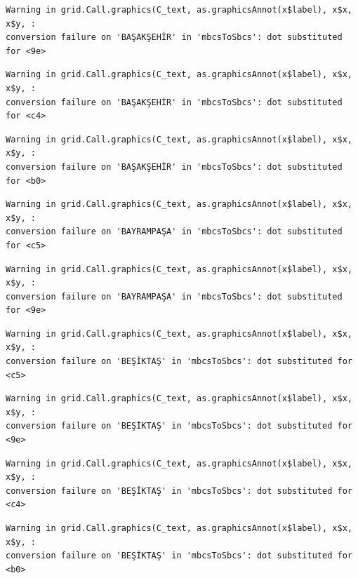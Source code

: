 \documentclass[
  11pt,
  a4paper,
  DIV=11,
  numbers=noendperiod]{scrartcl}
\begin{document}
\begin{verbatim}
Warning in grid.Call.graphics(C_text, as.graphicsAnnot(x$label), x$x, x$y, :
conversion failure on 'BAŞAKŞEHİR' in 'mbcsToSbcs': dot substituted for <9e>
\end{verbatim}

\begin{verbatim}
Warning in grid.Call.graphics(C_text, as.graphicsAnnot(x$label), x$x, x$y, :
conversion failure on 'BAŞAKŞEHİR' in 'mbcsToSbcs': dot substituted for <c4>
\end{verbatim}

\begin{verbatim}
Warning in grid.Call.graphics(C_text, as.graphicsAnnot(x$label), x$x, x$y, :
conversion failure on 'BAŞAKŞEHİR' in 'mbcsToSbcs': dot substituted for <b0>
\end{verbatim}

\begin{verbatim}
Warning in grid.Call.graphics(C_text, as.graphicsAnnot(x$label), x$x, x$y, :
conversion failure on 'BAYRAMPAŞA' in 'mbcsToSbcs': dot substituted for <c5>
\end{verbatim}

\begin{verbatim}
Warning in grid.Call.graphics(C_text, as.graphicsAnnot(x$label), x$x, x$y, :
conversion failure on 'BAYRAMPAŞA' in 'mbcsToSbcs': dot substituted for <9e>
\end{verbatim}

\begin{verbatim}
Warning in grid.Call.graphics(C_text, as.graphicsAnnot(x$label), x$x, x$y, :
conversion failure on 'BEŞİKTAŞ' in 'mbcsToSbcs': dot substituted for <c5>
\end{verbatim}

\begin{verbatim}
Warning in grid.Call.graphics(C_text, as.graphicsAnnot(x$label), x$x, x$y, :
conversion failure on 'BEŞİKTAŞ' in 'mbcsToSbcs': dot substituted for <9e>
\end{verbatim}

\begin{verbatim}
Warning in grid.Call.graphics(C_text, as.graphicsAnnot(x$label), x$x, x$y, :
conversion failure on 'BEŞİKTAŞ' in 'mbcsToSbcs': dot substituted for <c4>
\end{verbatim}

\begin{verbatim}
Warning in grid.Call.graphics(C_text, as.graphicsAnnot(x$label), x$x, x$y, :
conversion failure on 'BEŞİKTAŞ' in 'mbcsToSbcs': dot substituted for <b0>
\end{verbatim}
\end{document}
